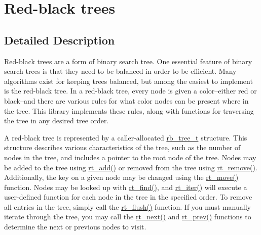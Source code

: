\hypertarget{group__dbprim__rbtree}{
\section{Red-black trees}
\label{group__dbprim__rbtree}
}


\subsection{Detailed Description}
Red-black trees are a form of binary search tree. One essential feature of binary search trees is that they need to be balanced in order to be efficient. Many algorithms exist for keeping trees balanced, but among the easiest to implement is the red-black tree. In a red-black tree, every node is given a color--either red or black--and there are various rules for what color nodes can be present where in the tree. This library implements these rules, along with functions for traversing the tree in any desired tree order.

A red-black tree is represented by a caller-allocated \hyperlink{group__dbprim__rbtree_ga0}{rb\_\-tree\_\-t} structure. This structure describes various characteristics of the tree, such as the number of nodes in the tree, and includes a pointer to the root node of the tree. Nodes may be added to the tree using \hyperlink{group__dbprim__rbtree_ga7}{rt\_\-add()} or removed from the tree using \hyperlink{group__dbprim__rbtree_ga9}{rt\_\-remove()}. Additionally, the key on a given node may be changed using the \hyperlink{group__dbprim__rbtree_ga8}{rt\_\-move()} function. Nodes may be looked up with \hyperlink{group__dbprim__rbtree_ga10}{rt\_\-find()}, and \hyperlink{group__dbprim__rbtree_ga12}{rt\_\-iter()} will execute a user-defined function for each node in the tree in the specified order. To remove all entries in the tree, simply call the \hyperlink{group__dbprim__rbtree_ga13}{rt\_\-flush()} function. If you must manually iterate through the tree, you may call the \hyperlink{group__dbprim__rbtree_ga11}{rt\_\-next()} and \hyperlink{group__dbprim__rbtree_ga29}{rt\_\-prev()} functions to determine the next or previous nodes to visit.

